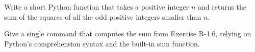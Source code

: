  \label{sssec:ex1_61_7}

Write a short Python function that takes a positive integer $n$ and returns the sum of the squares of all the odd positive integers smaller than $n$.

Give a single command that computes the sum from Exercise R-1.6, relying on Python's comprehension syntax and the built-in sum function.

